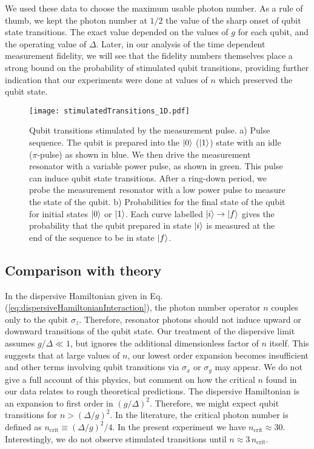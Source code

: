 We used these data to choose the maximum usable photon number.
As a rule of thumb, we kept the photon number at $1/2$ the value of the sharp onset of qubit state transitions.
The exact value depended on the values of $g$ for each qubit, and the operating value of $\Delta$.
Later, in our analysis of the time dependent measurement fidelity, we will see that the fidelity numbers themselves place a strong bound on the probability of stimulated qubit transitions, providing further indication that our experiments were done at values of $n$ which preserved the qubit state.

\begin{figure}
\begin{centering}
\texttt{[image: stimulatedTransitions\_1D.pdf]}
\par\end{centering}
\caption{Qubit transitions stimulated by the measurement pulse. a) Pulse sequence. The qubit is prepared into the $|0\rangle$ ($|1\rangle$) state with an idle ($\pi$-pulse) as shown in blue. We then drive the measurement resonator with a variable power pulse, as shown in green. This pulse can induce qubit state transitions. After a ring-down period, we probe the measurement resonator with a low power pulse to measure the state of the qubit. b) Probabilities for the final state of the qubit for initial states $|0\rangle$ or $|1\rangle$. Each curve labelled $|i\rangle\rightarrow|f\rangle$ gives the probability that the qubit prepared in state $|i\rangle$ is measured at the end of the sequence to be in state $|f\rangle$.}
\label{Fig:ch:results:sec:stimulatedTransitions:stimulatedTransitions_1D}
\end{figure}


\subsection{Comparison with theory}

In the dispersive Hamiltonian given in Eq.\,(\ref{eq:dispersiveHamiltonianInteraction}), the photon number operator $n$ couples only to the qubit $\sigma_z$.
Therefore, resonator photons should not induce upward or downward transitions of the qubit state.
Our treatment of the dispersive limit assumes $g / \Delta \ll 1$, but ignores the additional dimensionless factor of $n$ itself.
This suggests that at large values of $n$, our lowest order expansion becomes insufficient and other terms involving qubit transitions via $\sigma_x$ or $\sigma_y$ may appear.
We do not give a full account of this physics, but comment on how the critical $n$ found in our data relates to rough theoretical predictions.
The dispersive Hamiltonian is an expansion to first order in $(g/\Delta)^2$.
Therefore, we might expect qubit transitions for $n > (\Delta / g)^2$.
In the literature, the critical photon number is defined as $n_{\text{crit}} \equiv (\Delta/g)^2 / 4$.
In the present experiment we have $n_{\text{crit}} \approx 30$.
Interestingly, we do not observe stimulated transitions until $n \approx 3 \, n_{\text{crit}}$.


